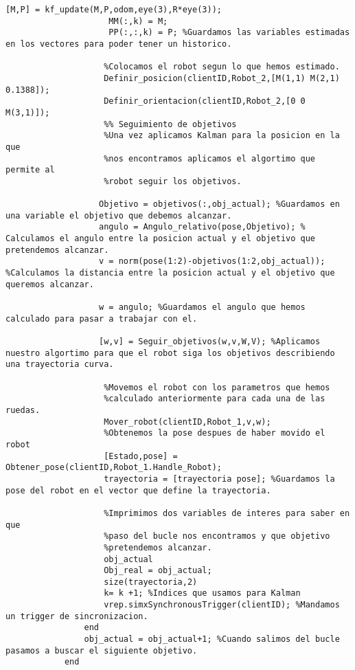 \begin{lstlisting}[frame=single]
                    [M,P] = kf_update(M,P,odom,eye(3),R*eye(3));
                     MM(:,k) = M; 
                     PP(:,:,k) = P; %Guardamos las variables estimadas en los vectores para poder tener un historico.
                       
                    %Colocamos el robot segun lo que hemos estimado.
                    Definir_posicion(clientID,Robot_2,[M(1,1) M(2,1) 0.1388]);
                    Definir_orientacion(clientID,Robot_2,[0 0 M(3,1)]);
                    %% Seguimiento de objetivos
                    %Una vez aplicamos Kalman para la posicion en la que
                    %nos encontramos aplicamos el algortimo que permite al
                    %robot seguir los objetivos.
                   
                   Objetivo = objetivos(:,obj_actual); %Guardamos en una variable el objetivo que debemos alcanzar.
                   angulo = Angulo_relativo(pose,Objetivo); % Calculamos el angulo entre la posicion actual y el objetivo que pretendemos alcanzar.
                   v = norm(pose(1:2)-objetivos(1:2,obj_actual)); %Calculamos la distancia entre la posicion actual y el objetivo que queremos alcanzar.

                   w = angulo; %Guardamos el angulo que hemos calculado para pasar a trabajar con el.
                   
                   [w,v] = Seguir_objetivos(w,v,W,V); %Aplicamos nuestro algortimo para que el robot siga los objetivos describiendo una trayectoria curva.

                    %Movemos el robot con los parametros que hemos
                    %calculado anteriormente para cada una de las ruedas.
                    Mover_robot(clientID,Robot_1,v,w);
                    %Obtenemos la pose despues de haber movido el robot
                    [Estado,pose] = Obtener_pose(clientID,Robot_1.Handle_Robot);
                    trayectoria = [trayectoria pose]; %Guardamos la pose del robot en el vector que define la trayectoria.

                    %Imprimimos dos variables de interes para saber en que
                    %paso del bucle nos encontramos y que objetivo
                    %pretendemos alcanzar.
                    obj_actual
                    Obj_real = obj_actual;
                    size(trayectoria,2)
                    k= k +1; %Indices que usamos para Kalman
                    vrep.simxSynchronousTrigger(clientID); %Mandamos un trigger de sincronizacion.
                end
                obj_actual = obj_actual+1; %Cuando salimos del bucle pasamos a buscar el siguiente objetivo.
            end


\end{lstlisting}

